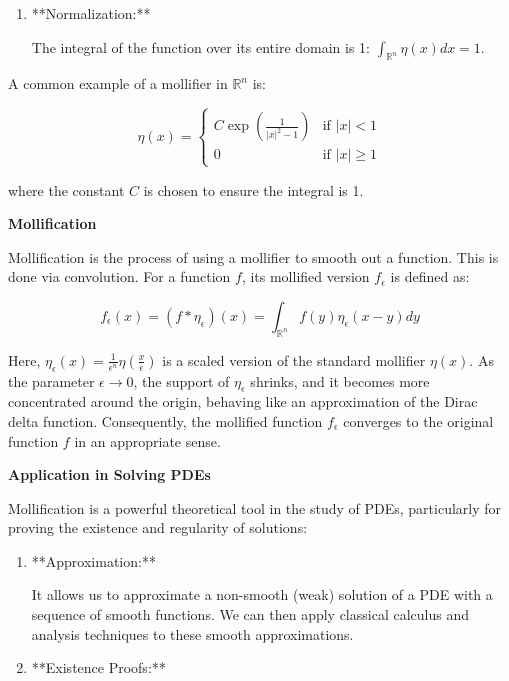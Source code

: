 \documentclass[12pt,a4paper]{report}
\begin{document}
{\begin{description}
\begin{enumerate}
\(\eta(x) = 0\) for \(|x| \ge 1\). This means it is non-zero only within a bounded region (the unit ball in \(\mathbb{R}^n\)).
\item **Normalization:** 

The integral of the function over its entire domain is 1: \(\int_{\mathbb{R}^n} \eta(x) dx = 1\).

\end{enumerate}
A common example of a mollifier in \(\mathbb{R}^n\) is:

\[ \eta(x) = \begin{cases} C \exp\left(\frac{1}{|x|^2 - 1}\right) & \text{if } |x| < 1 \\ 0 & \text{if } |x| \ge 1 \end{cases} \]

where the constant \(C\) is chosen to ensure the integral is 1.

\item \textbf{Mollification}

Mollification is the process of using a mollifier to smooth out a function. This is done via convolution. For a function \(f\), its mollified version \(f_\epsilon\) is defined as:

\[ f_\epsilon(x) = (f * \eta_\epsilon)(x) = \int_{\mathbb{R}^n} f(y) \eta_\epsilon(x-y) dy \]

Here, \(\eta_\epsilon(x) = \frac{1}{\epsilon^n} \eta\left(\frac{x}{\epsilon}\right)\) is a scaled version of the standard mollifier \(\eta(x)\). As the parameter \(\epsilon \to 0\), the support of \(\eta_\epsilon\) shrinks, and it becomes more concentrated around the origin, behaving like an approximation of the Dirac delta function. Consequently, the mollified function \(f_\epsilon\) converges to the original function \(f\) in an appropriate sense.

\item \textbf{ Application in Solving PDEs}

Mollification is a powerful theoretical tool in the study of PDEs, particularly for proving the existence and regularity of solutions:

\begin{enumerate}

\item **Approximation:** 

It allows us to approximate a non-smooth (weak) solution of a PDE with a sequence of smooth functions. We can then apply classical calculus and analysis techniques to these smooth approximations.
\item  **Existence Proofs:** 


\end{enumerate}
\end{description}}
\end{document}
